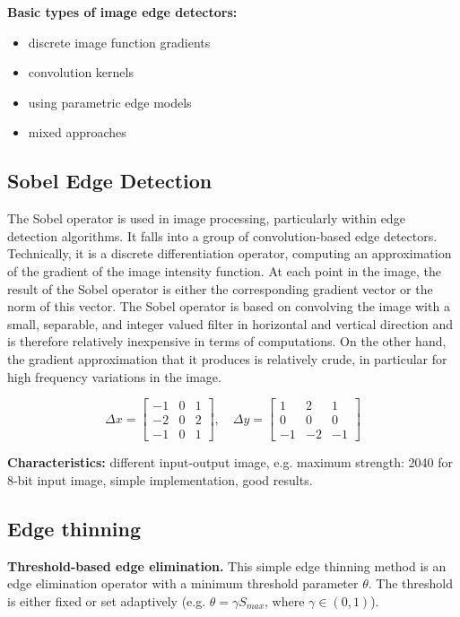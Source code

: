 \documentclass[letterpaper,12pt]{article}
\begin{document}
\textbf{Basic types of image edge detectors: }

\begin{itemize}
	\item discrete image function gradients
	\item convolution kernels
 	\item using parametric edge models
 	\item mixed approaches

\end{itemize}


\subsection{Sobel Edge Detection}

The Sobel operator is used in image processing, particularly within edge detection algorithms. It falls into a group of convolution-based edge detectors. Technically, it is a discrete differentiation operator, computing an approximation of the gradient of the image intensity function. At each point in the image, the result of the Sobel operator is either the corresponding gradient vector or the norm of this vector. The Sobel operator is based on convolving the image with a small, separable, and integer valued filter in horizontal and vertical direction and is therefore relatively inexpensive in terms of computations. On the other hand, the gradient approximation that it produces is relatively crude, in particular for high frequency variations in the image.

\[	
  	\Delta x = \begin{bmatrix}
  	-1 & 0 & 1 \\
  	-2 & 0 & 2 \\
  	-1 & 0 & 1
	\end{bmatrix}, \quad
	\Delta y = \begin{bmatrix}
  	1 & 2 & 1 \\
  	0 & 0 & 0 \\
  	-1 & -2 & -1
	\end{bmatrix}
\]

\textbf{Characteristics:} different input-output image, e.g. maximum strength: 2040 for 8-bit input image, simple implementation, good results.


\subsection{Edge thinning}

\textbf{Threshold-based edge elimination.} This simple edge thinning method is an edge elimination operator with a minimum threshold parameter $\theta$. The threshold is either fixed or set adaptively (e.g. $\theta = \gamma S_{max}$, where $ \gamma \in(0,1)$).
\end{document}
